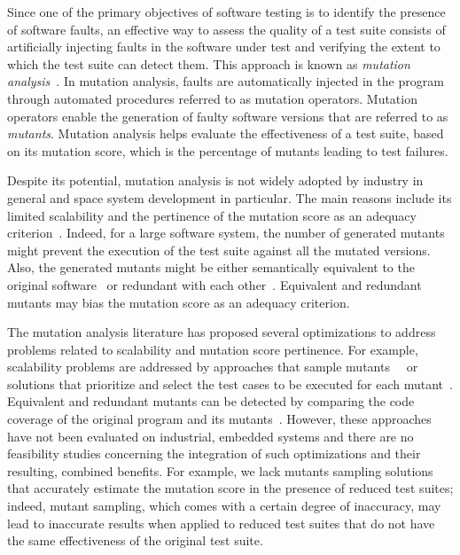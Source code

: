 Since one of the primary objectives of software testing is to identify the presence of software faults, an effective way to assess the quality of a test suite consists of artificially injecting faults in the software under test and verifying the extent to which the test suite can detect them.
This approach is known as \emph{mutation analysis}~\cite{DeMillo78}.
In mutation analysis, faults are automatically injected in the program through automated procedures referred to as mutation operators. Mutation operators enable the generation of faulty software versions that are referred to as \emph{mutants}.
Mutation analysis helps evaluate the effectiveness of a test suite,  based on its mutation score, which is the percentage of mutants leading to test failures.

Despite its potential, mutation analysis is not widely adopted by industry in general and space system development in particular. The main reasons include its limited scalability and the pertinence of the mutation score as an adequacy criterion~\cite{papadakis2016threats}. Indeed, for a large software system, the number of generated mutants might prevent the execution of the test suite against all the mutated versions. Also, the generated mutants might be either
semantically equivalent to the original software~\cite{madeyski2013overcoming} or redundant with each other~\cite{Shin:TSE:DCriterion:2018}.
Equivalent and redundant mutants may bias the mutation score as an adequacy criterion.

The mutation analysis literature has proposed several optimizations to address problems related to scalability and mutation score pertinence.
For example, scalability problems are addressed by approaches that sample mutants~\cite{zhang2013operator}~\cite{gopinath2015hard}
or solutions that prioritize and select the test cases to be executed for each mutant~\cite{zhang2013faster}. Equivalent and redundant mutants can be detected by comparing the code coverage of the original program and its mutants~\cite{grun2009impact,schuler2010covering,schuler2013covering,schuler2009efficient}.
However, these approaches
have not been evaluated on industrial, embedded systems
and there are no feasibility studies concerning the integration of such optimizations and their resulting, combined benefits.
For example, we lack mutants sampling solutions that accurately estimate the mutation score in the presence of reduced test suites;
indeed, mutant sampling, which comes with a certain degree of inaccuracy, may lead to inaccurate results when applied to reduced test suites that do not have the same effectiveness of the original test suite.

